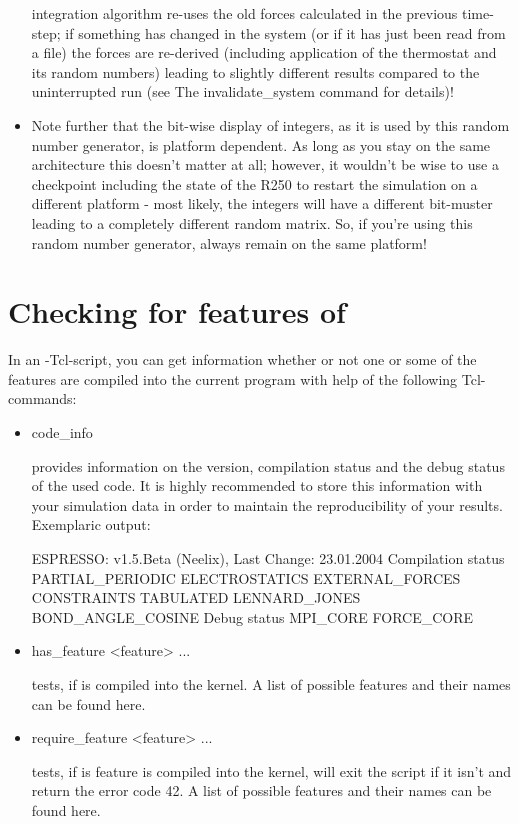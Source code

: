 \begin{itemize}
integration algorithm re-uses the old forces calculated in the
previous time-step; if something has changed in the system (or if it
has just been read from a file) the forces are re-derived (including
application of the thermostat and its random numbers) leading to
slightly different results compared to the uninterrupted run (see The
invalidate\_system command for details)!
\item Note further that the bit-wise display of integers, as it is
  used by this random number generator, is platform dependent. As long
  as you stay on the same architecture this doesn't matter at all;
  however, it wouldn't be wise to use a checkpoint including the state
  of the R250 to restart the simulation on a different platform - most
  likely, the integers will have a different bit-muster leading to a
  completely different random matrix.  So, if you're using this random
  number generator, always remain on the same platform!
\end{itemize}


\section{Checking for features of \es}

In an \es-Tcl-script, you can get information whether or not one or
some of the features are compiled into the current program with help
of the following Tcl-commands:
\begin{itemize}
 \item
\begin{code}
code\_info
\end{code}
provides information on the version, compilation status and the debug
status of the used code. It is highly recommended to store this
information with your simulation data in order to maintain the
reproducibility of your results.  Exemplaric output:
\begin{tclcode}
ESPRESSO: v1.5.Beta (Neelix), Last Change: 23.01.2004
{ Compilation status { PARTIAL_PERIODIC } { ELECTROSTATICS }
{ EXTERNAL_FORCES } { CONSTRAINTS } { TABULATED }
{ LENNARD_JONES } { BOND_ANGLE_COSINE } }
{ Debug status { MPI_CORE FORCE_CORE } }
\end{tclcode}
 \item
\begin{code}
has\_feature <feature> ...
\end{code}
tests, if  is compiled into the \es{} kernel. A list of
possible features and their names can be found here.
\item
\begin{code}
  require\_feature <feature> ...
\end{code}
tests, if  is feature is compiled into the \es{} kernel,
will exit the script if it isn't and return the error code 42. A list
of possible features and their names can be found here.
\end{itemize}


